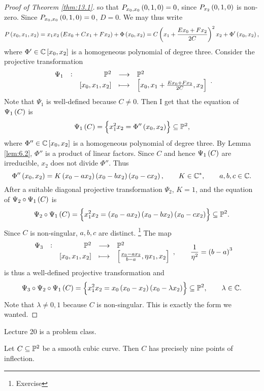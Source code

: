 \begin{proof}[Proof of Theorem \ref{thm:13.1}]
so that $ P_{x_0, x_0}\br{0, 1, 0} = 0 $, since $ P_{x_2}\br{0, 1, 0} $ is non-zero. Since $ P_{x_0, x_0}\br{0, 1, 0} = 0 $, $ D = 0 $. We may thus write
$$ P\br{x_0, x_1, x_2} = x_1x_2\br{Ex_0 + Cx_1 + Fx_2} + \Phi\br{x_0, x_2} = C\br{x_1 + \dfrac{Ex_0 + Fx_2}{2C}}^2x_2 + \Phi'\br{x_0, x_2}, $$
where $ \Phi' \in \CC\sbr{x_0, x_2} $ is a homogeneous polynomial of degree three. Consider the projective transformation
$$ \function[\Psi_1]{\PP^2}{\PP^2}{\sbr{x_0, x_1, x_2}}{\sbr{x_0, x_1 + \tfrac{Ex_0 + Fx_2}{2C}, x_2}}. $$
Note that $ \Psi_1 $ is well-defined because $ C \ne 0 $. Then I get that the equation of $ \Psi_1\br{C} $ is
$$ \Psi_1\br{C} = \cbr{x_1^2x_2 = \Phi''\br{x_0, x_2}} \subseteq \PP^2, $$
where $ \Phi'' \in \CC\sbr{x_0, x_2} $ is a homogeneous polynomial of degree three. By Lemma \ref{lem:6.2}, $ \Phi'' $ is a product of linear factors. Since $ C $ and hence $ \Psi_1\br{C} $ are irreducible, $ x_2 $ does not divide $ \Phi'' $. Thus
$$ \Phi''\br{x_0, x_2} = K\br{x_0 - ax_2}\br{x_0 - bx_2}\br{x_0 - cx_2}, \qquad K \in \CC^*, \qquad a, b, c \in \CC. $$
After a suitable diagonal projective transformation $ \Psi_2 $, $ K = 1 $, and the equation of $ \Psi_2 \circ \Psi_1\br{C} $ is
$$ \Psi_2 \circ \Psi_1\br{C} = \cbr{x_1^2x_2 = \br{x_0 - ax_2}\br{x_0 - bx_2}\br{x_0 - cx_2}} \subseteq \PP^2. $$
Since $ C $ is non-singular, $ a, b, c $ are distinct. \footnote{Exercise} The map
$$ \function[\Psi_3]{\PP^2}{\PP^2}{\sbr{x_0, x_1, x_2}}{\sbr{\tfrac{x_0 - ax_2}{b - a}, \eta x_1, x_2}}, \qquad \dfrac{1}{\eta^2} = \br{b - a}^3 $$
is thus a well-defined projective transformation and
$$ \Psi_3 \circ \Psi_2 \circ \Psi_1\br{C} = \cbr{x_1^2x_2 = x_0\br{x_0 - x_2}\br{x_0 - \lambda x_2}} \subseteq \PP^2, \qquad \lambda \in \CC. $$
Note that $ \lambda \ne 0, 1 $ because $ C $ is non-singular. This is exactly the form we wanted.
\end{proof}


Lecture 20 is a problem class.


\begin{corollary}
Let $ C \subseteq \mathbb{P}^2 $ be a smooth cubic curve. Then $ C $ has precisely nine points of inflection.
\end{corollary}

